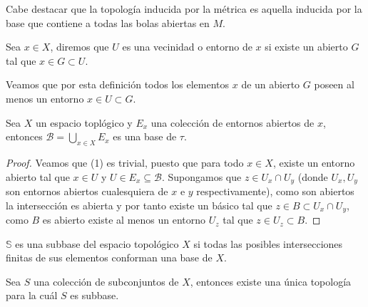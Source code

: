 \documentclass[11pt,oneside,a4paper]{book}
\begin{document}
Cabe destacar que la topología inducida por la métrica es aquella inducida por la base que contiene a todas las bolas abiertas en $M$.
\begin{mydef}
Sea $x\in X$, diremos que $U$ es una vecinidad o entorno de $x$ si existe un abierto $G$ tal que $x\in G\subset U$.
\end{mydef}
Veamos que por esta definición todos los elementos $x$ de un abierto $G$ poseen al menos un entorno $x\in U\subset G$.
\begin{thm}
Sea $X$ un espacio toplógico y $E_x$ una colección de entornos abiertos de $x$, entonces $\mathcal{B}=\bigcup_{x\in X}E_x$ es una base de $\tau$.
\end{thm}
\begin{proof}
Veamos que (1) es trivial, puesto que para todo $x\in X$, existe un entorno abierto tal que $x\in U$ y $U\in E_x\subseteq\mathcal{B}$. Supongamos que $z\in U_x\cap U_y$ (donde $U_x,U_y$ son entornos abiertos cualesquiera de $x$ e $y$ respectivamente), como son abiertos la intersección es abierta y por tanto existe un básico tal que $z\in B\subset U_x\cap U_y$, como $B$ es abierto existe al menos un entorno $U_z$ tal que $z\in U_z\subset B$.
\end{proof}
\begin{mydef}[Subbase]
$\mathbb{S}$ es una subbase del espacio topológico $X$ si todas las posibles intersecciones finitas de sus elementos conforman una base de $X$.
\end{mydef}
\begin{thm}
Sea $S$ una colección de subconjuntos de $X$, entonces existe una única topología para la cuál $S$ es subbase.
\end{thm}
\end{document}
